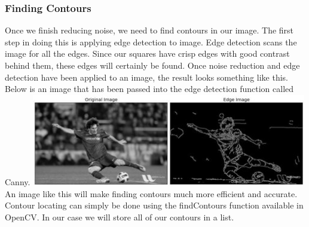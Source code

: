\documentclass[onecolumn, draftclsnofoot,10pt, compsoc]{IEEEtran}
\begin{document}
\subsubsection{Finding Contours}
Once we finish reducing noise, we need to find contours in our image.  The first step in doing this is applying edge detection to image.  Edge detection scans the image for all the edges.  Since our squares have crisp edges with good contrast behind them, these edges will certainly be found.  Once noise reduction and edge detection have been applied to an image, the result looks something like this.  Below is an image that has been passed into the edge detection function called Canny.
\newline
\includegraphics[height=4cm]{Images/canny1.jpg}
\newline
An image like this will make finding contours much more efficient and accurate.  Contour locating can simply be done using the findContours function available in OpenCV.  In  our case we will store all of our contours in a list.
\end{document}
